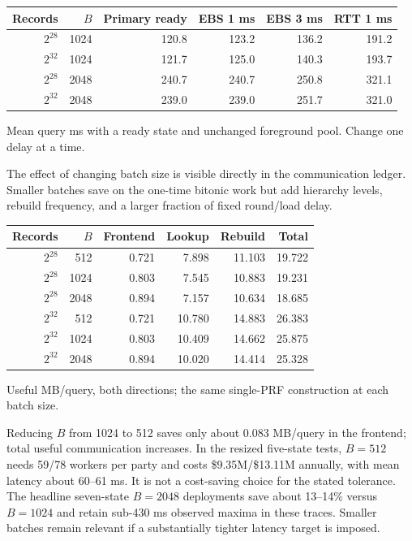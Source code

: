 \documentclass[11pt]{article}
\begin{document}
\begin{center}\footnotesize
\begin{tabular}{rrrrrr}\toprule
Records & $B$ & Primary ready & EBS 1 ms & EBS 3 ms & RTT 1 ms\\\midrule
$2^{28}$ & 1024 & 120.8 & 123.2 & 136.2 & 191.2\\
$2^{32}$ & 1024 & 121.7 & 125.0 & 140.3 & 193.7\\
$2^{28}$ & 2048 & 240.7 & 240.7 & 250.8 & 321.1\\
$2^{32}$ & 2048 & 239.0 & 239.0 & 251.7 & 321.0\\
\bottomrule\end{tabular}\end{center}
{\footnotesize Mean query ms with a ready state and unchanged foreground pool. Change one delay at a time.\par}

The effect of changing batch size is visible directly in the communication
ledger. Smaller batches save on the one-time bitonic work but add hierarchy
levels, rebuild frequency, and a larger fraction of fixed round/load delay.

\begin{center}\small
\begin{tabular}{rrrrrr}\toprule
Records & $B$ & Frontend & Lookup & Rebuild & Total\\\midrule
$2^{28}$ & 512 & 0.721 & 7.898 & 11.103 & 19.722\\
$2^{28}$ & 1024 & 0.803 & 7.545 & 10.883 & 19.231\\
$2^{28}$ & 2048 & 0.894 & 7.157 & 10.634 & 18.685\\
$2^{32}$ & 512 & 0.721 & 10.780 & 14.883 & 26.383\\
$2^{32}$ & 1024 & 0.803 & 10.409 & 14.662 & 25.875\\
$2^{32}$ & 2048 & 0.894 & 10.020 & 14.414 & 25.328\\
\bottomrule\end{tabular}\end{center}
{\footnotesize Useful MB/query, both directions; the same single-PRF construction at each batch size.\par}

Reducing $B$ from 1024 to 512 saves only about 0.083 MB/query in the frontend;
total useful communication increases. In the resized five-state tests,
$B=512$ needs 59/78 workers per party and costs \$9.35M/\$13.11M annually,
with mean latency about 60--61 ms. It is not a cost-saving choice for the
stated tolerance. The headline seven-state $B=2048$ deployments save about
13--14\% versus $B=1024$ and retain sub-430 ms observed maxima in these
traces. Smaller batches remain relevant if a substantially tighter latency
target is imposed.
\end{document}
